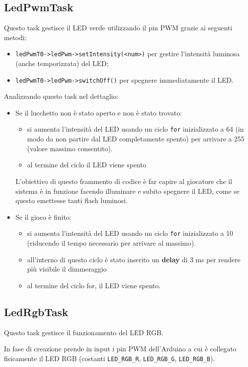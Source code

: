 \subsection{LedPwmTask}
Questo task gestisce il LED verde utilizzando il pin PWM grazie ai seguenti metodi:
\begin{itemize}
	\item \texttt{ledPwmT0->ledPwm->setIntensity(<num>)} per gestire l'intensità luminosa (anche temporizzata) del LED;
	\item \texttt{ledPwmT0->ledPwm->switchOff()} per spegnere immediatamente il LED.
\end{itemize}
Analizzando questo task nel dettaglio:
\begin{itemize}
	\item Se il lucchetto non è stato aperto e non è stato trovato:
	\begin{itemize}
		\item si aumenta l'intensità del LED usando un ciclo \texttt{for} inizializzato a 64 (in modo da non partire dal LED completamente spento) per arrivare a 255 (valore massimo consentito).
		\item al termine del ciclo il LED viene spento
	\end{itemize}
	L'obiettivo di questo frammento di codice è far capire al giocatore che il sistema è in funzione facendo illuminare e subito spegnere il LED, come se questo emettesse tanti flash luminosi.
	\item Se il gioco è finito:
	\begin{itemize}
		\item si aumenta l'intensità del LED usando un ciclo \texttt{for} inizializzato a 10 (riducendo il tempo necessario per arrivare al massimo).
		\item all'interno di questo ciclo è stato inserito un \textbf{delay} di 3 ms per rendere più visibile il dimmeraggio
		\item al termine del ciclo for, il LED viene spento.
	\end{itemize}
\end{itemize}

\subsection{LedRgbTask}
Questo task gestisce il funzionamento del LED RGB.

In fase di creazione prende in input i pin PWM dell'Arduino a cui è collegato fisicamente il LED RGB (costanti \texttt{LED\_RGB\_R}, \texttt{LED\_RGB\_G}, \texttt{LED\_RGB\_B}).

